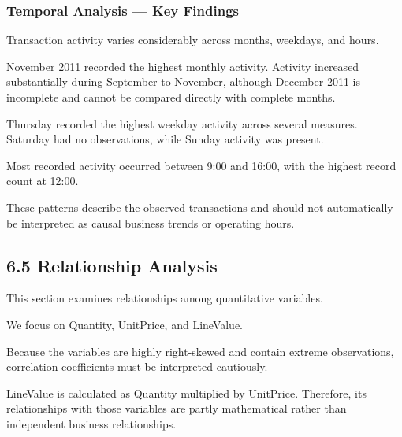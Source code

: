 \documentclass[11pt]{article}
\begin{document}
    
    \subsubsection{Temporal Analysis --- Key
Findings}\label{temporal-analysis-key-findings}

Transaction activity varies considerably across months, weekdays, and
hours.

November 2011 recorded the highest monthly activity. Activity increased
substantially during September to November, although December 2011 is
incomplete and cannot be compared directly with complete months.

Thursday recorded the highest weekday activity across several measures.
Saturday had no observations, while Sunday activity was present.

Most recorded activity occurred between 9:00 and 16:00, with the highest
record count at 12:00.

These patterns describe the observed transactions and should not
automatically be interpreted as causal business trends or operating
hours.

    \subsection{6.5 Relationship Analysis}\label{relationship-analysis}

This section examines relationships among quantitative variables.

We focus on Quantity, UnitPrice, and LineValue.

Because the variables are highly right-skewed and contain extreme
observations, correlation coefficients must be interpreted cautiously.

LineValue is calculated as Quantity multiplied by UnitPrice. Therefore,
its relationships with those variables are partly mathematical rather
than independent business relationships.
\end{document}
